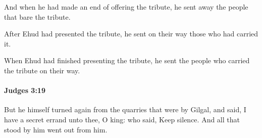 			\begin{versebox}
					\item[BHS] 
					\item[ASV] And when he had made an end of offering the tribute, he sent away the people that bare the tribute.
					\item[NIV] After Ehud had presented the tribute, he sent on their way those who had carried it.
					\item[NRSV] When Ehud had finished presenting the tribute, he sent the people who carried the tribute on their way.
			\end{versebox}

		\paragraph{Judges 3:19} %
			\label{JUDGES-3-19}

			But he himself turned again from the quarries that were by Gilgal, and said, I have a secret errand unto thee, O king: who said, Keep silence. And all that stood by him went out from him.

